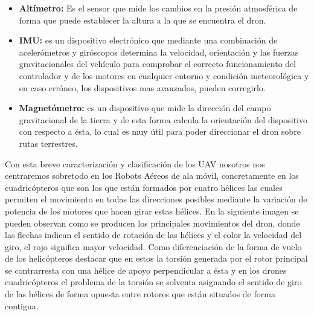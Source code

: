 \begin{itemize}
		\item \textbf{Altímetro:} Es el sensor que mide los cambios en la presión atmosférica de forma que puede establecer la altura a la que se encuentra el dron.
		\item \textbf{IMU:} es un dispositivo electrónico que mediante una combinación de acelerómetros y giróscopos determina la velocidad, orientación y las fuerzas gravitacionales del vehículo para comprobar el correcto funcionamiento del controlador y de los motores en cualquier entorno y condición meteorológica y en caso erróneo, los dispositivos mas avanzados, pueden corregirlo.
		\item \textbf{Magnetómetro:} es un dispositivo que mide la dirección del campo gravitacional de la tierra y de esta forma calcula la orientación del dispositivo con respecto a ésta, lo cual es muy útil para poder direccionar el dron sobre rutas terrestres.
	\end{itemize}

\hspace{1cm} Con esta breve caracterización y clasificación de los UAV nosotros nos centraremos sobretodo en los Robots Aéreos de ala móvil, concretamente en los cuadricópteros que son los que están formados por cuatro hélices las cuales permiten el movimiento en todas las direcciones posibles mediante la variación de potencia de los motores que hacen girar estas hélices. En la siguiente imagen se pueden observan como se producen los principales movimientos del dron, donde las flechas indican el sentido de rotación de las hélices y el color la velocidad del giro, el rojo significa mayor velocidad. Como diferenciación de la forma de vuelo de los helicópteros destacar que en estos la torsión generada por el rotor principal se contrarresta con una hélice de apoyo perpendicular a ésta y en los drones cuadricópteros el problema de la torsión se solventa asignando el sentido de giro de las hélices de forma opuesta entre rotores que están situados de forma contigua.

